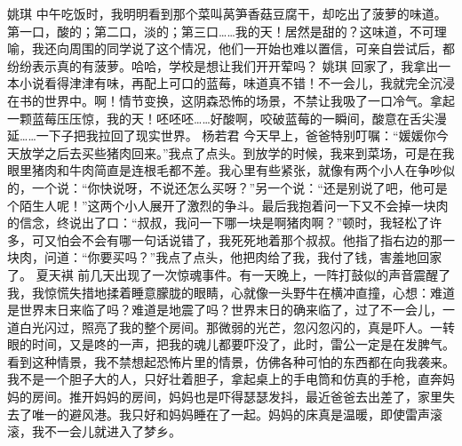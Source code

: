 \markdownRendererDocumentBegin
{}\markdownRendererInterblockSeparator
{}\markdownRendererInterblockSeparator
{}姚琪\markdownRendererInterblockSeparator
{}中午吃饭时，我明明看到那个菜叫莴笋香菇豆腐干，却吃出了菠萝的味道。第一口，酸的；第二口，淡的；第三口……我的天！居然是甜的？这味道，不可理喻，我还向周围的同学说了这个情况，他们一开始也难以置信，可亲自尝试后，都纷纷表示真的有菠萝。哈哈，学校是想让我们开开荤吗？\markdownRendererInterblockSeparator
{}\markdownRendererInterblockSeparator
{}姚琪\markdownRendererInterblockSeparator
{}回家了，我拿出一本小说看得津津有味，再配上可口的蓝莓，味道真不错！不一会儿，我就完全沉浸在书的世界中。啊！情节变换，这阴森恐怖的场景，不禁让我吸了一口冷气。拿起一颗蓝莓压压惊，我的天！呸呸呸……好酸啊，咬破蓝莓的一瞬间，酸意在舌尖漫延……一下子把我拉回了现实世界。\markdownRendererInterblockSeparator
{}\markdownRendererInterblockSeparator
{}杨若君\markdownRendererInterblockSeparator
{}今天早上，爸爸特别叮嘱：“媛媛你今天放学之后去买些猪肉回来。”我点了点头。到放学的时候，我来到菜场，可是在我眼里猪肉和牛肉简直是连根毛都不差。我心里有些紧张，就像有两个小人在争吵似的，一个说：“你快说呀，不说还怎么买呀？”另一个说：“还是别说了吧，他可是个陌生人呢！”这两个小人展开了激烈的争斗。最后我抱着问一下又不会掉一块肉的信念，终说出了口：“叔叔，我问一下哪一块是啊猪肉啊？”顿时，我轻松了许多，可又怕会不会有哪一句话说错了，我死死地着那个叔叔。他指了指右边的那一块肉，问道：“你要买吗？”我点了点头，他把肉给了我，我付了钱，害羞地回家了。\markdownRendererInterblockSeparator
{}\markdownRendererInterblockSeparator
{}夏天褀\markdownRendererInterblockSeparator
{}前几天出现了一次惊魂事件。有一天晚上，一阵打鼓似的声音震醒了我，我惊慌失措地揉着睡意朦胧的眼睛，心就像一头野牛在横冲直撞，心想：难道是世界末日来临了吗？难道是地震了吗？世界末日的确来临了，过了不一会儿，一道白光闪过，照亮了我的整个房间。那微弱的光芒，忽闪忽闪的，真是吓人。一转眼的时间，又是咚的一声，把我的魂儿都要吓没了，此时，雷公一定是在发脾气。看到这种情景，我不禁想起恐怖片里的情景，仿佛各种可怕的东西都在向我袭来。我不是一个胆子大的人，只好壮着胆子，拿起桌上的手电筒和仿真的手枪，直奔妈妈的房间。推开妈妈的房间，妈妈也是吓得瑟瑟发抖，最近爸爸去出差了，家里失去了唯一的避风港。我只好和妈妈睡在了一起。妈妈的床真是温暖，即使雷声滚滚，我不一会儿就进入了梦乡。\markdownRendererInterblockSeparator
{}\markdownRendererInterblockSeparator
